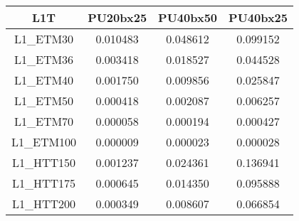 
\begin{tabular}{|c||c|c|c|}
\hline
L1T & PU20bx25 & PU40bx50 & PU40bx25 \\
\hline \hline
L1\_ETM30 & 0.010483 & 0.048612 & 0.099152 \\
L1\_ETM36 & 0.003418 & 0.018527 & 0.044528 \\
L1\_ETM40 & 0.001750 & 0.009856 & 0.025847 \\
L1\_ETM50 & 0.000418 & 0.002087 & 0.006257 \\
L1\_ETM70 & 0.000058 & 0.000194 & 0.000427 \\
L1\_ETM100 & 0.000009 & 0.000023 & 0.000028 \\
L1\_HTT150 & 0.001237 & 0.024361 & 0.136941 \\
L1\_HTT175 & 0.000645 & 0.014350 & 0.095888 \\
L1\_HTT200 & 0.000349 & 0.008607 & 0.066854 \\
\hline
\end{tabular}

